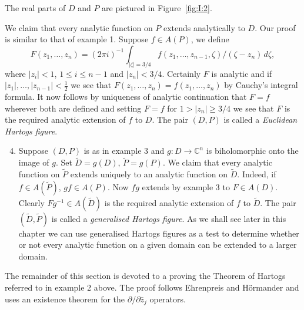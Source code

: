 The real parts of $D$ and $P$ are pictured in Figure~\ref{fig:I:2}.
\begin{center}
    \begin{minipage}{\linewidth}
        \centering
        
    \end{minipage}
\end{center}
We claim that every analytic function on $P$ extends analytically to $D$. Our proof is similar to that of example 1. Suppose $f\in A(P)$, we define
\[F(z_1,\ldots,z_n)=(2\pi i)^{-1}\int_{|\zeta|=3/4}f(z_1,\ldots,z_{n-1},\zeta)/(\zeta-z_n)\,d\zeta,\]
where $|z_i|<1$, $1\leq i\leq n-1$ and $|z_n|<3/4$. Certainly $F$ is analytic and if $|z_1|,\ldots,|z_{n-1}|<\tfrac12$ we see that $F(z_1,\ldots,z_n)=f(z_1,\ldots,z_n)$ by Cauchy's integral formula. It now follows by uniqueness of analytic continuation that $F=f$ wherever both are defined and setting $F=f$ for $1>|z_n|\geq3/4$ we see that $F$ is the required analytic extension of $f$ to $D$. The pair $(D,P)$ is called a \emph{Euclidean Hartogs figure}.
\begin{enumerate}\setcounter{enumi}{3}
\item Suppose $(D,P)$ is as in example 3 and $g:D\to\mathbb C^n$ is biholomorphic onto the image of $g$. Set $\widetilde D=g(D)$, $\widetilde P=g(P)$. We claim that every analytic function on $\widetilde P$ extends uniquely to an analytic function on $\widetilde D$. Indeed, if $f\in A(\widetilde P)$, $gf\in A(P)$. Now $fg$ extends by example 3 to $F\in A(D)$. Clearly $Fg^{-1}\in A(\widetilde D)$ is the required analytic extension of $f$ to $\widetilde D$. The pair $(\widetilde D,\widetilde P)$ is called a \emph{generalised Hartogs figure}. As we shall see later in this chapter we can use generalised Hartogs figures as a test to determine whether or not every analytic function on a given domain can be extended to a larger domain.
\end{enumerate}
The remainder of this section is devoted to a proving the Theorem of Hartogs referred to in example 2 above. The proof follows Ehrenpreis \cite{bib:I:ehrenpreis-l:1} and H\"ormander \cite{bib:I:hormander-l:1} and uses an existence theorem for the $\partial/\partial\bar z_j$ operators.

